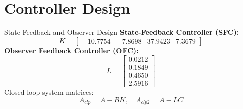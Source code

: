 \documentclass[10pt,compress,mathserif]{beamer}
\begin{document}
\section{Controller Design}
\begin{frame}{State-Feedback and Observer Design}
\textbf{State-Feedback Controller (SFC):}
\[ K = \begin{bmatrix} -10.7754 & -7.8698 & 37.9423 & 7.3679 \end{bmatrix} \]
\textbf{Observer Feedback Controller (OFC):}
\[ L = \begin{bmatrix} 0.0212 \\ 0.1849 \\ 0.4650 \\ 2.5916 \end{bmatrix} \]
Closed-loop system matrices:
\[ A_{clp} = A - BK, \quad A_{clp2} = A - LC \]
\end{frame}
\end{document}
